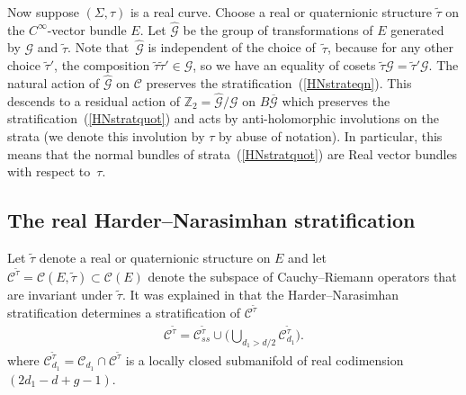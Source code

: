 \documentclass[10pt,a4paper]{amsart}
\numberwithin{equation}{section}
\begin{document}
Now suppose $(\Sigma, \tau)$ is a real curve. Choose a real or quaternionic structure $\tilde{\tau}$ on the $C^{\infty}$-vector bundle $E$. Let $\hat{{\mathcal G}}$ be the group of transformations of $E$ generated by ${\mathcal G}$ and $\tilde{\tau}$. Note that~$\hat{{\mathcal G}}$ is independent of the choice of~$\tilde{\tau}$, because for any other choice $\tilde{\tau}'$, the composition $\tilde{\tau} \tilde{\tau}' \in {\mathcal G}$, so we have an equality of cosets $\tilde{\tau} {\mathcal G} = \tilde{\tau}'{\mathcal G}$. The natural action of $\hat{{\mathcal G}}$ on ${\mathcal C}$ preserves the stratif\/ication~(\ref{HNstrateqn}). This descends to a residual action of ${\mathbb Z}_2 = \hat{{\mathcal G}}/{\mathcal G}$ on $B\overline{{\mathcal G}}$ which preserves the stratif\/ication~(\ref{HNstratquot}) and acts by anti-holomorphic involutions on the strata (we denote this involution by $\tau$ by abuse of notation). In particular, this means that the normal bundles of strata~(\ref{HNstratquot}) are Real vector bundles with respect to~$\tau$.

\subsection{The real Harder--Narasimhan stratif\/ication}\label{realstratsect}

Let $\tilde{\tau}$ denote a real or quaternionic structure on $E$ and let ${\mathcal C}^{\tilde{\tau}} ={\mathcal C}(E,\tilde{\tau}) \subset {\mathcal C}(E)$ denote the subspace of Cauchy--Riemann operators that are invariant under $\tilde{\tau}$. It was explained in \cite{B} that the Harder--Narasimhan stratif\/ication determines a stratif\/ication of ${\mathcal C}^{\tilde{\tau}}${\samepage
\begin{gather}\label{rHNstrat}
 {\mathcal C}^{\tilde{\tau}} = {\mathcal C}_{ss}^{\tilde{\tau}} \cup \bigg( \bigcup_{d_1 > d/2} {\mathcal C}_{d_1}^{\tilde{\tau}} \bigg).
 \end{gather}
where ${\mathcal C}^{\tilde{\tau}}_{d_1} = {\mathcal C}_{d_1} \cap {\mathcal C}^{\tilde{\tau}}$ is a locally closed submanifold of real codimension $(2d_1-d+g-1)$.}
\end{document}
